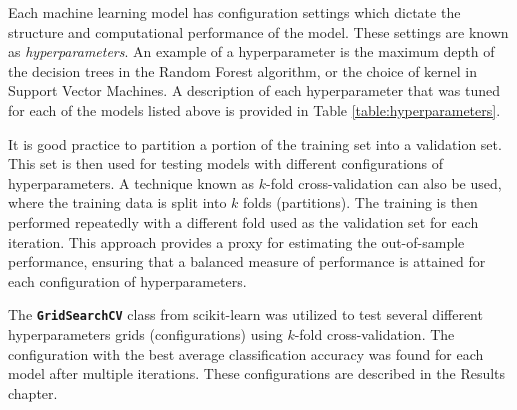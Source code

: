 Each machine learning model has configuration settings which dictate the structure and computational performance of the model. These settings are known as \textit{hyperparameters}. An example of a hyperparameter is the maximum depth of the decision trees in the Random Forest algorithm, or the choice of kernel in Support Vector Machines.  A description of each hyperparameter that was tuned for each of the models listed above is provided in Table \ref{table:hyperparameters}.

It is good practice to partition a portion of the training set into a validation set. This set is then used for testing models with different configurations of hyperparameters. A technique known as $k$-fold cross-validation can also be used, where the training data is split into $k$ folds (partitions). The training is then performed repeatedly with a different fold used as the validation set for each iteration. This approach provides a proxy for estimating the out-of-sample performance, ensuring that a balanced measure of performance is attained for each configuration of hyperparameters.

The \texttt{\textbf{GridSearchCV}} class from scikit-learn was utilized to test several different hyperparameters grids (configurations) using $k$-fold cross-validation. The configuration with the best average classification accuracy was found for each model after multiple iterations. These configurations are described in the Results chapter.


